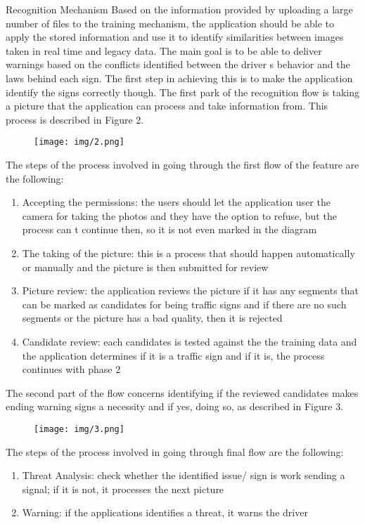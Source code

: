 \documentclass[runningheads,a4paper,11pt]{report}
\begin{document}
Recognition Mechanism
Based on the information provided by uploading a large number of files to the training mechanism, the application should be able to apply the stored information and use it to identify similarities between images taken in real time and legacy data. The main goal is to be able to deliver warnings based on the conflicts identified between the driver s behavior and the laws behind each sign. The first step in achieving this is to make the application identify the signs correctly though. 
The first park of the recognition flow is taking a picture that the application can process and take information from. This process is described in Figure 2.

\begin{figure}[h]
\texttt{[image: img/2.png]}
\centering
\end{figure}

The steps of the process involved in going through the first flow of the feature are the following:
\begin{enumerate}
  \item Accepting the permissions: the users should let the application user the camera for taking the photos and they have the option to refuse, but the process can t continue then, so it is not even marked in the diagram
  \item The taking of the picture:  this is a process that should happen automatically or manually and the picture is then submitted for review
  \item Picture review: the application reviews the picture if it has any segments that can be marked as candidates for being traffic signs and if there are no such segments or the picture has a bad quality, then it is rejected
  \item Candidate review: each candidates is tested against the the training data and the application determines if it is a traffic sign and if it is, the process continues with phase 2
\end{enumerate}

The second part of the flow concerns identifying if the reviewed candidates makes ending warning signs a necessity and if yes, doing so, as described in Figure 3.

\begin{figure}[h]
\texttt{[image: img/3.png]}
\centering
\end{figure}

The steps of the process involved in going through final flow are the following:
\begin{enumerate}
  \item Threat Analysis: check whether the identified issue/ sign is work sending a signal; if it is not, it processes the next picture
  \item Warning: if the applications identifies a threat, it warns the driver
\end{enumerate}
\end{document}
